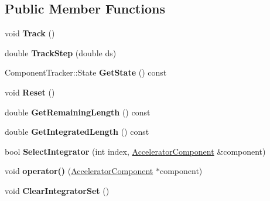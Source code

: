 \subsection*{Public Member Functions}
\begin{DoxyCompactItemize}
\item 
\mbox{\label{classComponentTracker_a71f34b270f618c4ca7d57bbe2a188c14}} 
void {\bfseries Track} ()
\item 
\mbox{\label{classComponentTracker_a5aa444b7ec70f30c5ed5000eb334efce}} 
double {\bfseries Track\+Step} (double ds)
\item 
\mbox{\label{classComponentTracker_ac4b090709df62a3cf8852229108df99a}} 
Component\+Tracker\+::\+State {\bfseries Get\+State} () const
\item 
\mbox{\label{classComponentTracker_adaf3f184f56c9c48f1dbbf93f3d1098c}} 
void {\bfseries Reset} ()
\item 
\mbox{\label{classComponentTracker_aec1cf2003378b9cb77dd06dcee8a51ad}} 
double {\bfseries Get\+Remaining\+Length} () const
\item 
\mbox{\label{classComponentTracker_ac18f1348aea3d837ce8dd7ffb38e068f}} 
double {\bfseries Get\+Integrated\+Length} () const
\item 
\mbox{\label{classComponentTracker_a2c56d801b3a3527d9df82b27bf3a199e}} 
bool {\bfseries Select\+Integrator} (int index, \hyperlink{classAcceleratorComponent}{Accelerator\+Component} \&component)
\item 
\mbox{\label{classComponentTracker_aa6e30205dd34c75a1631583684aa2968}} 
void {\bfseries operator()} (\hyperlink{classAcceleratorComponent}{Accelerator\+Component} $\ast$component)
\item 
\mbox{\label{classComponentTracker_a66a893a1dc4bd8c76b6e86c34f630e72}} 
void {\bfseries Clear\+Integrator\+Set} ()
\end{DoxyCompactItemize}

